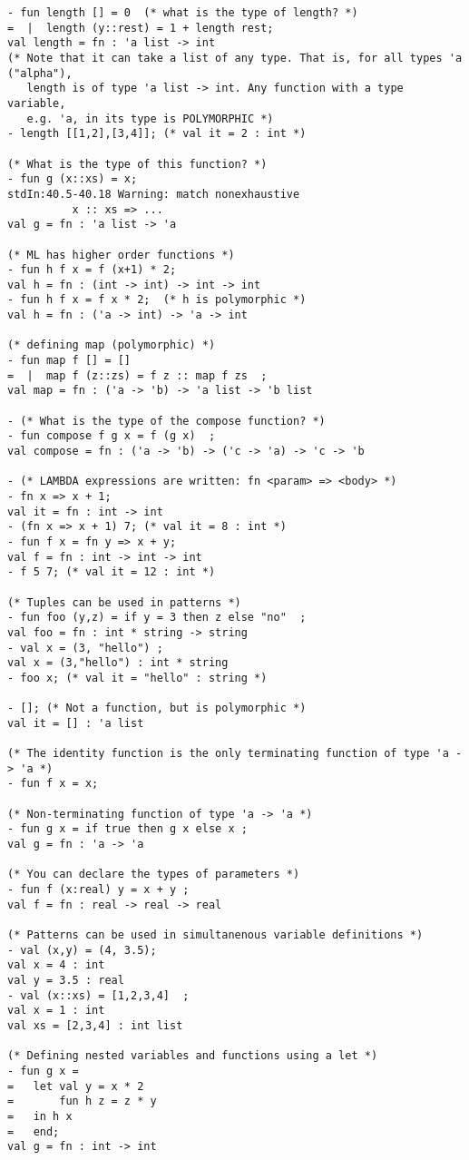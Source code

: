 \documentclass[10pt]{article}
\begin{document}
\begin{verbatim}
- fun length [] = 0  (* what is the type of length? *)
=  |  length (y::rest) = 1 + length rest;
val length = fn : 'a list -> int
(* Note that it can take a list of any type. That is, for all types 'a ("alpha"),
   length is of type 'a list -> int. Any function with a type variable, 
   e.g. 'a, in its type is POLYMORPHIC *)
- length [[1,2],[3,4]]; (* val it = 2 : int *)

(* What is the type of this function? *)
- fun g (x::xs) = x;  
stdIn:40.5-40.18 Warning: match nonexhaustive
          x :: xs => ...
val g = fn : 'a list -> 'a

(* ML has higher order functions *)
- fun h f x = f (x+1) * 2;
val h = fn : (int -> int) -> int -> int
- fun h f x = f x * 2;  (* h is polymorphic *)
val h = fn : ('a -> int) -> 'a -> int

(* defining map (polymorphic) *)
- fun map f [] = []
=  |  map f (z::zs) = f z :: map f zs  ;
val map = fn : ('a -> 'b) -> 'a list -> 'b list

- (* What is the type of the compose function? *)
- fun compose f g x = f (g x)  ;
val compose = fn : ('a -> 'b) -> ('c -> 'a) -> 'c -> 'b

- (* LAMBDA expressions are written: fn <param> => <body> *)
- fn x => x + 1;
val it = fn : int -> int
- (fn x => x + 1) 7; (* val it = 8 : int *)
- fun f x = fn y => x + y;
val f = fn : int -> int -> int
- f 5 7; (* val it = 12 : int *)

(* Tuples can be used in patterns *)
- fun foo (y,z) = if y = 3 then z else "no"  ;
val foo = fn : int * string -> string
- val x = (3, "hello") ;
val x = (3,"hello") : int * string
- foo x; (* val it = "hello" : string *)

- []; (* Not a function, but is polymorphic *)
val it = [] : 'a list

(* The identity function is the only terminating function of type 'a -> 'a *)
- fun f x = x;

(* Non-terminating function of type 'a -> 'a *)
- fun g x = if true then g x else x ; 
val g = fn : 'a -> 'a

(* You can declare the types of parameters *)
- fun f (x:real) y = x + y ;
val f = fn : real -> real -> real

(* Patterns can be used in simultanenous variable definitions *)
- val (x,y) = (4, 3.5);
val x = 4 : int
val y = 3.5 : real
- val (x::xs) = [1,2,3,4]  ;
val x = 1 : int
val xs = [2,3,4] : int list

(* Defining nested variables and functions using a let *)
- fun g x =
=   let val y = x * 2
=       fun h z = z * y
=   in h x 
=   end;
val g = fn : int -> int


\end{verbatim}
\end{document}
